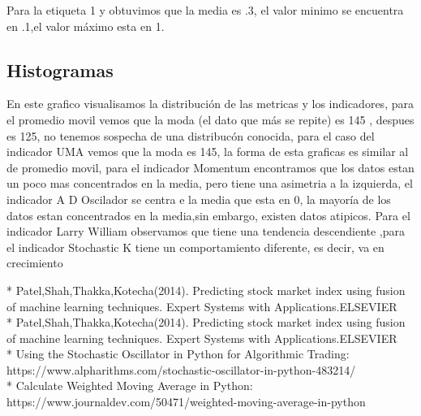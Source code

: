 \documentclass[letter, 12pt]{article}
\begin{document}
Para la etiqueta 1 y obtuvimos que la media es .3, el valor minimo se encuentra en .1,el valor máximo esta en 1.

\subsection{Histogramas}



\begin{figure}[H]
    \centering
    \end{figure}

En este grafico visualisamos la distribución de las metricas y los indicadores, para el promedio movil vemos que la moda (el dato que más se repite) es 145 , despues es 125, no tenemos sospecha de una distribucón conocida, para el caso del indicador UMA vemos que la moda es 145, la forma de esta graficas es similar al de promedio movil, para el indicador Momentum encontramos que los datos estan un poco mas concentrados en la media, pero tiene una asimetria a la izquierda, el indicador A D Oscilador se centra e la media que esta en 0, la mayoría de los datos estan concentrados en la media,sin embargo, existen datos atipicos.
Para el indicador Larry William observamos que tiene una tendencia descendiente ,para el indicador Stochastic K tiene un comportamiento diferente, es decir, va en crecimiento  

\begin{thebibliography}{10} 

* Patel,Shah,Thakka,Kotecha(2014). Predicting stock market index using fusion of machine learning techniques. Expert Systems with Applications.ELSEVIER\\


* Patel,Shah,Thakka,Kotecha(2014). Predicting stock market index using fusion of machine learning techniques. Expert Systems with Applications.ELSEVIER\\


* Using the Stochastic Oscillator in Python for Algorithmic Trading: \\  https://www.alpharithms.com/stochastic-oscillator-in-python-483214/\\


* Calculate Weighted Moving Average in Python:\\ https://www.journaldev.com/50471/weighted-moving-average-in-python\\


\end{thebibliography}
\end{document}
